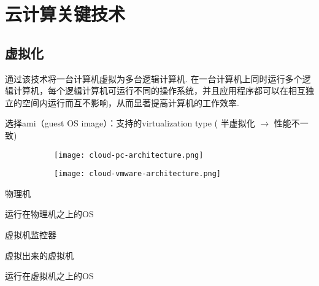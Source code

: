 \chapter{云计算关键技术}

\section{虚拟化}

\begin{definition}[虚拟化]
    通过该技术将一台计算机虚拟为多台逻辑计算机. 在一台计算机上同时运行多个逻辑计算机，每个逻辑计算机可运行不同的操作系统，并且应用程序都可以在相互独立的空间内运行而互不影响，从而显著提高计算机的工作效率. 
\end{definition}

\begin{example}[Amazon开启虚拟机]
    选择ami（guest OS image）：支持的virtualization type ( 半虚拟化 $\rightarrow$ 性能不一致)
\end{example}

\begin{figure}
    \centering
    \begin{subfigure}[b]{0.3 \textwidth}
        \centering
        \texttt{[image: cloud-pc-architecture.png]}
    \end{subfigure}
    \begin{subfigure}[b]{0.3 \textwidth}
        \centering
        \texttt{[image: cloud-vmware-architecture.png]}
    \end{subfigure}
\end{figure}

\begin{definition}
    物理机
\end{definition}

\begin{definition}[Host OS]
    运行在物理机之上的OS
\end{definition}

\begin{definition}
    虚拟机监控器
\end{definition}

\begin{definition}
    虚拟出来的虚拟机
\end{definition}

\begin{definition}[Guest OS]
    运行在虚拟机之上的OS
\end{definition}

